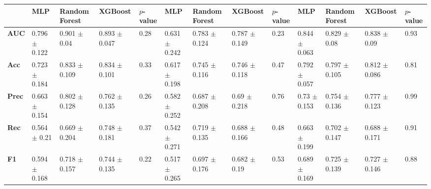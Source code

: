 \begin{tabular}{lllllllllllll}
\toprule
 & MLP & Random Forest & XGBoost & $p$-value & MLP & Random Forest & XGBoost & $p$-value & MLP & Random Forest & XGBoost & $p$-value \\
\midrule
\textbf{AUC} & 0.796 $\pm$ 0.122 & 0.901 $\pm$ 0.04 & 0.893 $\pm$ 0.047 & 0.28 & 0.631 $\pm$ 0.242 & 0.783 $\pm$ 0.124 & 0.787 $\pm$ 0.149 & 0.23 & 0.844 $\pm$ 0.063 & 0.829 $\pm$ 0.08 & 0.838 $\pm$ 0.09 & 0.93 \\
\textbf{Acc} & 0.723 $\pm$ 0.184 & 0.833 $\pm$ 0.109 & 0.834 $\pm$ 0.101 & 0.33 & 0.617 $\pm$ 0.198 & 0.745 $\pm$ 0.116 & 0.746 $\pm$ 0.118 & 0.47 & 0.792 $\pm$ 0.057 & 0.797 $\pm$ 0.105 & 0.812 $\pm$ 0.086 & 0.81 \\
\textbf{Prec} & 0.663 $\pm$ 0.154 & 0.802 $\pm$ 0.128 & 0.762 $\pm$ 0.135 & 0.26 & 0.582 $\pm$ 0.252 & 0.687 $\pm$ 0.208 & 0.69 $\pm$ 0.218 & 0.76 & 0.73 $\pm$ 0.153 & 0.754 $\pm$ 0.136 & 0.777 $\pm$ 0.123 & 0.99 \\
\textbf{Rec} & 0.564 $\pm$ 0.21 & 0.669 $\pm$ 0.204 & 0.748 $\pm$ 0.181 & 0.37 & 0.542 $\pm$ 0.271 & 0.719 $\pm$ 0.135 & 0.688 $\pm$ 0.166 & 0.48 & 0.663 $\pm$ 0.199 & 0.702 $\pm$ 0.147 & 0.688 $\pm$ 0.171 & 0.91 \\
\textbf{F1} & 0.594 $\pm$ 0.168 & 0.718 $\pm$ 0.157 & 0.744 $\pm$ 0.135 & 0.22 & 0.517 $\pm$ 0.265 & 0.697 $\pm$ 0.176 & 0.682 $\pm$ 0.19 & 0.53 & 0.689 $\pm$ 0.169 & 0.725 $\pm$ 0.139 & 0.727 $\pm$ 0.146 & 0.88 \\
\bottomrule
\end{tabular}
